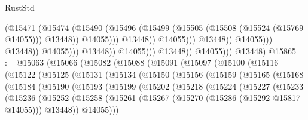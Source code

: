 \begin{lexlean}{RustStd}
\begin{coremodule}
                                                      (@15471
                                                        (@15474
                                                          (@15490
                                                            (@15496
                                                              (@15499
                                                                (@15505
                                                                  (@15508 (@15524 (@15769 @14055)))
                                                                  @13448))
                                                              @14055)))
                                                        @13448))
                                                    @14055)))
                                              @13448))
                                          @14055)))
                                    @13448))
                                @14055)))
                          @13448))
                      @14055)))
                @13448))
            @14055)))
      @13448)
@15865 := @15063
    (@15066
      (@15082
        (@15088
          (@15091
            (@15097
              (@15100
                (@15116
                  (@15122
                    (@15125
                      (@15131
                        (@15134
                          (@15150
                            (@15156
                              (@15159
                                (@15165
                                  (@15168
                                    (@15184
                                      (@15190
                                        (@15193
                                          (@15199
                                            (@15202
                                              (@15218
                                                (@15224
                                                  (@15227
                                                    (@15233
                                                      (@15236
                                                        (@15252
                                                          (@15258
                                                            (@15261
                                                              (@15267
                                                                (@15270
                                                                  (@15286 (@15292 @15817 @14055)))
                                                                @13448))
                                                            @14055)))

\end{coremodule}
\end{lexlean}
